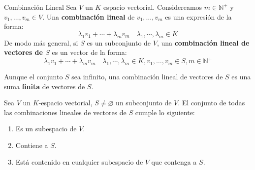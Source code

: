\begin{definition}{Combinación Lineal}{}
    Sea $V$ un $K$ espacio vectorial. Considereamos $m \in \mathbb{N}^+$ y $v_1,\dots,v_m \in V$. Una \textbf{combinación lineal} de $v_1,\dots,v_m$ es una expresión de la forma:
    $$\lambda_1 v_1 + \cdots + \lambda_m v_m \quad \lambda_1, \cdots, \lambda_m \in K$$
    De modo más general, si $S$ es un subconjunto de $V$, una \textbf{combinación lineal de vectores de $S$} es un vector de la forma:
    $$\lambda_1 v_1 + \cdots + \lambda_m v_m \quad \lambda_1, \cdots, \lambda_m \in K, v_1,\dots,v_m \in S, m \in \mathbb{N}^+$$
\end{definition}
\begin{obs}{}{}
    Aunque el conjunto $S$ sea infinito, una combinación lineal de vectores de $S$ es una suma \textbf{finita} de vectores de $S$.
\end{obs}
\begin{proposition}
    Sea $V$ un $K$-espacio vectorial, $S \neq \varnothing$ un subconjunto de $V$. El conjunto de todas las combinaciones lineales de vectores de $S$ cumple lo siguiente:
    \begin{enumerate}[label=\alph*)]
        \item Es un subespacio de $V$.
        \item Contiene a $S$.
        \item Está contenido en cualquier subespacio de $V$ que contenga a $S$.
    \end{enumerate}
\end{proposition}


